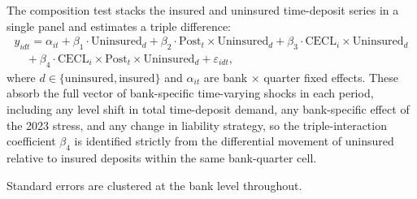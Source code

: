 The composition test stacks the insured and uninsured time-deposit
series in a single panel and estimates a triple difference:
\begin{equation}
\begin{split}
  y_{idt}
  = \alpha_{it}
  + \beta_1 \cdot \mathrm{Uninsured}_d
  + \beta_2 \cdot \mathrm{Post}_{t} \times \mathrm{Uninsured}_d
  + \beta_3 \cdot \mathrm{CECL}_i \times \mathrm{Uninsured}_d \\
  \quad + \beta_4 \cdot \mathrm{CECL}_i \times \mathrm{Post}_{t} \times \mathrm{Uninsured}_d
  + \varepsilon_{idt},
\end{split}
\label{eq:triple}
\end{equation}
where $d \in \{\text{uninsured}, \text{insured}\}$ and $\alpha_{it}$
are bank $\times$ quarter fixed effects.  These absorb the full vector
of bank-specific time-varying shocks in each period, including any
level shift in total time-deposit demand, any bank-specific effect of
the 2023 stress, and any change in liability strategy, so the
triple-interaction coefficient $\beta_4$ is identified strictly from
the differential movement of uninsured relative to insured deposits
within the same bank-quarter cell.

Standard errors are clustered at the bank level throughout.
